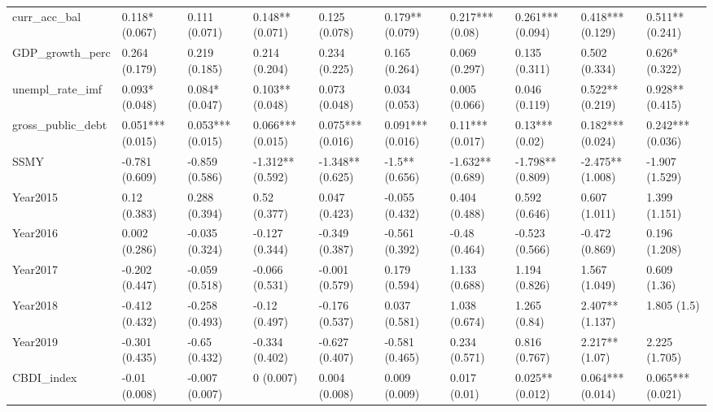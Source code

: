 \begin{table}[ht]
\begin{tabular}{llllllllll}
  curr\_acc\_bal & 0.118* (0.067) & 0.111 (0.071) & 0.148** (0.071) & 0.125 (0.078) & 0.179** (0.079) & 0.217*** (0.08) & 0.261*** (0.094) & 0.418*** (0.129) & 0.511** (0.241) \\ 
  GDP\_growth\_perc & 0.264 (0.179) & 0.219 (0.185) & 0.214 (0.204) & 0.234 (0.225) & 0.165 (0.264) & 0.069 (0.297) & 0.135 (0.311) & 0.502 (0.334) & 0.626* (0.322) \\ 
  unempl\_rate\_imf & 0.093* (0.048) & 0.084* (0.047) & 0.103** (0.048) & 0.073 (0.048) & 0.034 (0.053) & 0.005 (0.066) & 0.046 (0.119) & 0.522** (0.219) & 0.928** (0.415) \\ 
  gross\_public\_debt & 0.051*** (0.015) & 0.053*** (0.015) & 0.066*** (0.015) & 0.075*** (0.016) & 0.091*** (0.016) & 0.11*** (0.017) & 0.13*** (0.02) & 0.182*** (0.024) & 0.242*** (0.036) \\ 
  SSMY & -0.781 (0.609) & -0.859 (0.586) & -1.312** (0.592) & -1.348** (0.625) & -1.5** (0.656) & -1.632** (0.689) & -1.798** (0.809) & -2.475** (1.008) & -1.907 (1.529) \\ 
  Year2015 & 0.12 (0.383) & 0.288 (0.394) & 0.52 (0.377) & 0.047 (0.423) & -0.055 (0.432) & 0.404 (0.488) & 0.592 (0.646) & 0.607 (1.011) & 1.399 (1.151) \\ 
  Year2016 & 0.002 (0.286) & -0.035 (0.324) & -0.127 (0.344) & -0.349 (0.387) & -0.561 (0.392) & -0.48 (0.464) & -0.523 (0.566) & -0.472 (0.869) & 0.196 (1.208) \\ 
  Year2017 & -0.202 (0.447) & -0.059 (0.518) & -0.066 (0.531) & -0.001 (0.579) & 0.179 (0.594) & 1.133 (0.688) & 1.194 (0.826) & 1.567 (1.049) & 0.609 (1.36) \\ 
  Year2018 & -0.412 (0.432) & -0.258 (0.493) & -0.12 (0.497) & -0.176 (0.537) & 0.037 (0.581) & 1.038 (0.674) & 1.265 (0.84) & 2.407** (1.137) & 1.805 (1.5) \\ 
  Year2019 & -0.301 (0.435) & -0.65 (0.432) & -0.334 (0.402) & -0.627 (0.407) & -0.581 (0.465) & 0.234 (0.571) & 0.816 (0.767) & 2.217** (1.07) & 2.225 (1.705) \\ 
  CBDI\_index & -0.01 (0.008) & -0.007 (0.007) & 0 (0.007) & 0.004 (0.008) & 0.009 (0.009) & 0.017 (0.01) & 0.025** (0.012) & 0.064*** (0.014) & 0.065*** (0.021) \\ 
   \bottomrule
\end{tabular}
\endgroup
\end{table}
